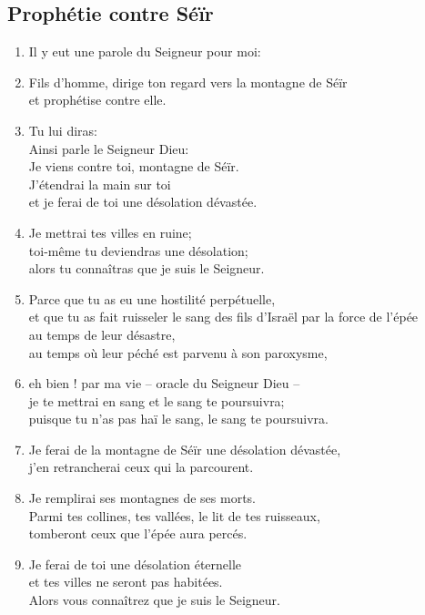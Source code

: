 \subsection*{Prophétie contre Séïr}
\begin{enumerate}[leftmargin=\psleftmargin, labelsep = \pslabelsep, label={\arabic*}, font=\color{\pscolor}\small\textsuperscript, parsep=0em, itemsep=0em, topsep=0em ]
    \item Il y eut une parole du Seigneur pour moi:
    \item Fils d’homme, dirige ton regard vers la montagne de Séïr \\ et prophétise contre elle.
    \item Tu lui diras: \\ Ainsi parle le Seigneur Dieu: \\ Je viens contre toi, montagne de Séïr. \\
          J’étendrai la main sur toi \\ et je ferai de toi une désolation dévastée.
    \item Je mettrai tes villes en ruine; \\ toi-même tu deviendras une désolation; \\ alors tu connaîtras que je suis le Seigneur.
    \item Parce que tu as eu une hostilité perpétuelle, \\ et que tu as fait ruisseler le sang des fils d’Israël par la force de l’épée \\ au temps de leur désastre, \\ au temps où leur péché est parvenu à son paroxysme,
    \item eh bien ! par ma vie – oracle du Seigneur Dieu – \\ je te mettrai en sang et le sang te poursuivra; \\ puisque tu n’as pas haï le sang, le sang te poursuivra.
    \item Je ferai de la montagne de Séïr une désolation dévastée, \\ j’en retrancherai ceux qui la parcourent.
    \item Je remplirai ses montagnes de ses morts. \\ Parmi tes collines, tes vallées, le lit de tes ruisseaux, \\ tomberont ceux que l’épée aura percés.
    \item Je ferai de toi une désolation éternelle \\ et tes villes ne seront pas habitées. \\ Alors vous connaîtrez que je suis le Seigneur. \verseSpace

\end{enumerate}
